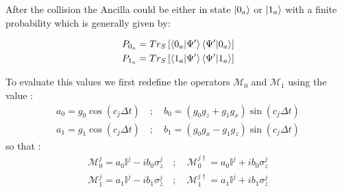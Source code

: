 \documentclass[a4paper,12pt]{article}
\begin{document}
After the collision the Ancilla could be either in state $ \ket{0_a} $ or $ \ket{1_a} $ with a finite probability which is generally given by:

\begin{align}
	P_{0_{a}} = Tr_{S} \left[\braket{0_a|\Psi'}\braket{\Psi'|0_a} \right] \\
	P_{1_{a}} = Tr_{S} \left[\braket{1_a|\Psi'}\braket{\Psi'|1_a} \right]
\end{align}

To evaluate this values we first redefine the operators $ \mathcal{M}_{0} $ and $ \mathcal{M}_{1} $ using the value :
\begin{align}
	a_{0} = g_{0} \cos{\left(c_{j}\Delta t\right)} \quad ; \quad b_{0} = \left(g_{0} g_{z} + g_{1}g_{x} \right) \sin{\left(c_{j}\Delta t\right)} \label{eq_a0_b0_def} \\
	a_{1} = g_{1} \cos{\left(c_{j}\Delta t\right)} \quad ; \quad b_{1} = \left(g_{0} g_{x} - g_{1}g_{z} \right) \sin{\left(c_{j}\Delta t\right)} \label{eq_a01b1_def}
\end{align}
so that :
\begin{align}
	\mathcal{M}_{0}^{j} = a_{0} \mathbb{I}^{j} -i b_{0} \sigma_{z}^{j} \quad ; \quad \mathcal{M}_{0}^{j \dagger} = a_{0} \mathbb{I}^{j} + i b_{0} \sigma_{z}^{j} \label{eq_M0_def} \\
	\mathcal{M}_{1}^{j} = a_{1} \mathbb{I}^{j} -i b_{1} \sigma_{z}^{j} \quad ; \quad \mathcal{M}_{1}^{j \dagger} = a_{1} \mathbb{I}^{j} + i b_{1} \sigma_{z}^{j}
	\label{eq_M1_def}
\end{align}
\end{document}
